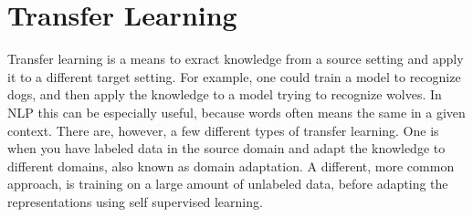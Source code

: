 \documentclass{report}
\begin{document}
\section{Transfer Learning}
Transfer learning is a means to exract knowledge from a source setting and apply it to a different target setting. For example, one could train a model to recognize dogs, and then apply the knowledge to a model trying to recognize wolves. In NLP this can be especially useful, because words often means the same in a given context. There are, however, a few different types of transfer learning. One is when you have labeled data in the source domain and adapt the knowledge to different domains, also known as domain adaptation. A different, more common approach, is training on a large amount of unlabeled data, before adapting the representations using self supervised learning.

\end{document}
